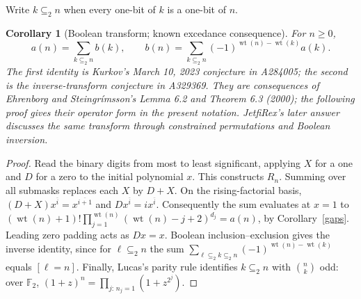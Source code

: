 \documentclass[11pt]{article}
\newcommand{\wt}{\operatorname{wt}}
\newtheorem{corollary}[theorem]{Corollary}
\begin{document}
Write $k\subseteq_2 n$ when every one-bit of $k$ is a one-bit of $n$.
\begin{corollary}[Boolean transform; known excedance consequence]\label{boolean}
For $n\geq0$,
\begin{equation}\label{bool}
 a(n)=\sum_{k\subseteq_2 n}b(k),\qquad
 b(n)=\sum_{k\subseteq_2 n}(-1)^{\wt(n)-\wt(k)}a(k).
\end{equation}
The first identity is Kurkov's March 10, 2023 conjecture in A284005;
the second is the inverse-transform conjecture in A329369.
They are consequences of Ehrenborg and Steingr\'imsson's
Lemma 6.2 and Theorem 6.3 (2000); the following proof gives their
operator form in the present notation.
JetfiRex's later answer~\cite{jetfirex} discusses the same transform
through constrained permutations and Boolean inversion.
\end{corollary}
\begin{proof}
Read the binary digits from most to least significant, applying $X$
for a one and $D$ for a zero to the initial polynomial $x$.
This constructs $R_n$. Summing over all submasks replaces each $X$
by $D+X$. On the rising-factorial basis,
$(D+X)x^{\overline i}=x^{\overline{i+1}}$ and
$Dx^{\overline i}=i x^{\overline i}$.
Consequently the sum evaluates at $x=1$ to
$(\wt(n)+1)!\prod_{j=1}^{\wt(n)}(\wt(n)-j+2)^{d_j}=a(n)$,
by Corollary~\ref{gaps}. Leading zero padding acts as $Dx=x$.
Boolean inclusion--exclusion gives the inverse identity, since for
$\ell\subseteq_2 n$ the sum
$\sum_{\ell\subseteq_2 k\subseteq_2 n}(-1)^{\wt(n)-\wt(k)}$
equals $[\ell=n]$. Finally, Lucas's parity rule identifies
$k\subseteq_2 n$ with $\binom nk$ odd: over $\mathbb F_2$,
$(1+z)^n=\prod_{j:\,n_j=1}(1+z^{2^j})$.
\end{proof}
\end{document}
